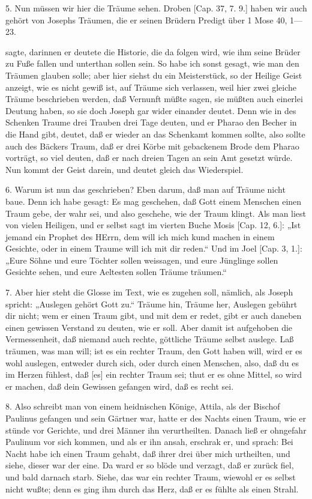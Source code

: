 5. Nun müssen wir hier die Träume sehen. Droben [Cap. 37, 7. 9.] haben wir auch gehört von Josephs Träumen, die er seinen Brüdern
Predigt über 1 Mose 40, 1—23.


sagte, darinnen er deutete die Historie, die da folgen wird, wie ihm seine Brüder zu Fuße fallen und unterthan sollen sein. So habe ich sonst gesagt, wie man den Träumen glauben solle; aber hier siehst du ein Meisterstück, so der Heilige Geist anzeigt, wie es nicht gewiß ist, auf Träume sich verlassen, weil hier zwei gleiche Träume beschrieben werden, daß Vernunft müßte sagen, sie müßten auch einerlei Deutung haben, so sie doch Joseph gar wider einander deutet. Denn wie in des Schenken Traume drei Trauben drei Tage deuten, und er Pharao den Becher in die Hand gibt, deutet, daß er wieder an das Schenkamt kommen sollte, also sollte auch des Bäckers Traum, daß er drei Körbe mit gebackenem Brode dem Pharao vorträgt, so viel deuten, daß er nach dreien Tagen an sein Amt gesetzt würde. Nun kommt der Geist darein, und deutet gleich das Wiederspiel.

6. Warum ist nun das geschrieben? Eben darum, daß man auf Träume nicht baue. Denn ich habe gesagt: Es mag geschehen, daß Gott einem Menschen einen Traum gebe, der wahr sei, und also geschehe, wie der Traum klingt. Als man liest von vielen Heiligen, und er selbst sagt im vierten Buche Mosis [Cap. 12, 6.]: „Ist jemand ein Prophet des HErrn, dem will ich mich kund machen in einem Gesichte, oder in einem Traume will ich mit dir reden.“ Und im Joel [Cap. 3, 1.]: „Eure Söhne und eure Töchter sollen weissagen, und eure Jünglinge sollen Gesichte sehen, und eure Aeltesten sollen Träume träumen.“

7. Aber hier steht die Glosse im Text, wie es zugehen soll, nämlich, als Joseph spricht: „Auslegen gehört Gott zu.“ Träume hin, Träume her, Auslegen gebührt dir nicht; wem er einen Traum gibt, und mit dem er redet, gibt er auch daneben einen gewissen Verstand zu deuten, wie er soll. Aber damit ist aufgehoben die Vermessenheit, daß niemand auch rechte, göttliche Träume selbst auslege. Laß träumen, was man will; ist es ein rechter Traum, den Gott haben will, wird er es wohl auslegen, entweder durch sich, oder durch einen Menschen, also, daß du es im Herzen fühlest, daß [es] ein rechter Traum sei; thut er es ohne Mittel, so wird er machen, daß dein Gewissen gefangen wird, daß es recht sei.

8. Also schreibt man von einem heidnischen Könige, Attila, als der Bischof Paulinus gefangen und sein Gärtner war, hatte er des Nachts einen Traum, wie er stünde vor Gerichte, und drei Männer ihn verurtheilten. Danach ließ er ohngefahr Paulinum vor sich kommen, und als er ihn ansah, erschrak er, und sprach: Bei Nacht habe ich einen Traum gehabt, daß ihrer drei über mich urtheilten, und siehe, dieser war der eine. Da ward er so blöde und verzagt, daß er zurück fiel, und bald darnach starb. Siehe, das war ein rechter Traum, wiewohl er es selbst nicht wußte; denn es ging ihm durch das Herz, daß er es fühlte als einen Strahl.

